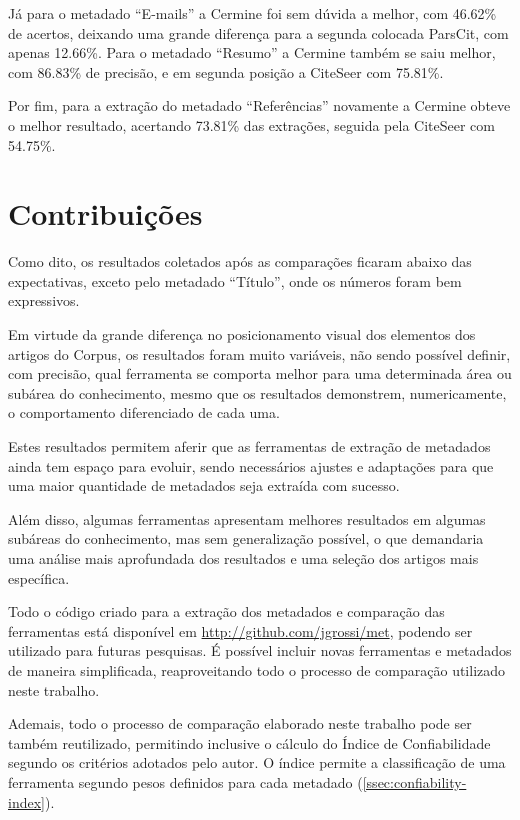 Já para o metadado ``E-mails'' a Cermine foi sem dúvida a melhor, com 46.62\% de acertos, deixando uma grande diferença para a segunda colocada ParsCit, com apenas 12.66\%. Para o metadado ``Resumo'' a Cermine também se saiu melhor, com 86.83\% de precisão, e em segunda posição a CiteSeer com 75.81\%.

Por fim, para a extração do metadado ``Referências'' novamente a Cermine obteve o melhor resultado, acertando 73.81\% das extrações, seguida pela CiteSeer com 54.75\%.

\section{Contribuições}
\label{sec:contributions}

Como dito, os resultados coletados após as comparações ficaram abaixo das expectativas, exceto pelo metadado ``Título'', onde os números foram bem expressivos.

Em virtude da grande diferença no posicionamento visual dos elementos dos artigos do Corpus, os resultados foram muito variáveis, não sendo possível definir, com precisão, qual ferramenta se comporta melhor para uma determinada área ou subárea do conhecimento, mesmo que os resultados demonstrem, numericamente, o comportamento diferenciado de cada uma.

Estes resultados permitem aferir que as ferramentas de extração de metadados ainda tem espaço para evoluir, sendo necessários ajustes e adaptações para que uma maior quantidade de metadados seja extraída com sucesso. 

Além disso, algumas ferramentas apresentam melhores resultados em algumas subáreas do conhecimento, mas sem generalização possível, o que demandaria uma análise mais aprofundada dos resultados e uma seleção dos artigos mais específica.

Todo o código criado para a extração dos metadados e comparação das ferramentas está disponível em \url{http://github.com/jgrossi/met}, podendo ser utilizado para futuras pesquisas. É possível incluir novas ferramentas e metadados de maneira simplificada, reaproveitando todo o processo de comparação utilizado neste trabalho.

Ademais, todo o processo de comparação elaborado neste trabalho pode ser também reutilizado, permitindo inclusive o cálculo do Índice de Confiabilidade segundo os critérios adotados pelo autor. O índice permite a classificação de uma ferramenta segundo pesos definidos para cada metadado (\autoref{ssec:confiability-index}).


